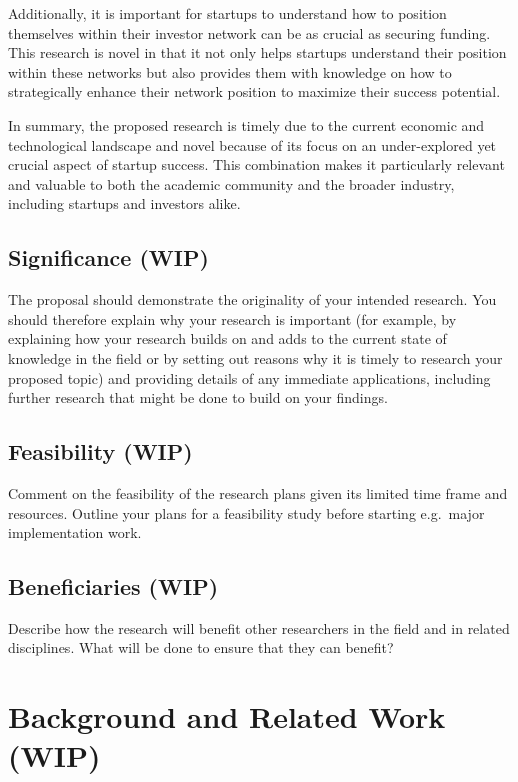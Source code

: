 \documentclass[a4paper,11pt]{article}
\begin{document}
Additionally, it is important for startups to understand how to position themselves within their investor network can be as crucial as securing funding. This research is novel in that it not only helps startups understand their position within these networks but also provides them with knowledge on how to strategically enhance their network position to maximize their success potential.

In summary, the proposed research is timely due to the current economic and technological landscape and novel because of its focus on an under-explored yet crucial aspect of startup success. This combination makes it particularly relevant and valuable to both the academic community and the broader industry, including startups and investors alike.

\subsection{Significance (WIP)}

The proposal should demonstrate the originality of your intended research. You should therefore explain why your research is important (for example, by explaining how your research builds on and adds to the current state of knowledge in the field or by setting out reasons why it is timely to research your proposed topic) and providing details of any immediate applications, including further research that might be done to build on your findings.

\subsection{Feasibility (WIP)}

Comment on the feasibility of the research plans given its limited time frame and resources. Outline your plans for a feasibility study before starting e.g.\ major implementation work.

\subsection{Beneficiaries (WIP)}

Describe how the research will benefit other researchers in the field and in related disciplines. What will be done to ensure that they can benefit? 


\section{Background and Related Work (WIP)}
\end{document}
